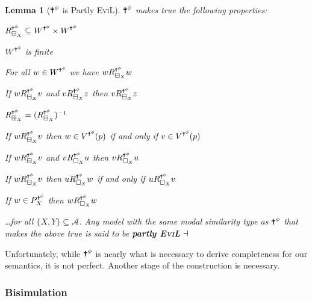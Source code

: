 \documentclass[11pt]{article}
\numberwithin{equation}{subsection}
\newtheorem{lemma}[theorem]{Lemma}
\renewcommand{\Cross}{\textrm{\ding{61}}}
\newcommand{\Nec}{\Box}
\newcommand{\BB}{\boxminus}
\newcommand{\BBI}{\boxplus}
\begin{document}
\begin{lemma}[$\Cross^\phi$ is Partly \textsc{EviL}]\label{partly}
$\Cross^\phi$ makes true the following properties:
\begin{mynum}
\item $R^{\Cross^\phi}_{\BB_X} \subseteq W^{\Cross^\phi} \times W^{\Cross^\phi}$
\item $W^{\Cross^\phi}$ is finite
\item For all $w \in W^{\Cross^\phi}$ we have $w R^{\Cross^\phi}_{\BB_X} w$ 
\item If $w R^{\Cross^\phi}_{\BB_X} v$ and $v R^{\Cross^\phi}_{\BB_X} z$ then $v R^{\Cross^\phi}_{\BB_X} z$
\item $R^{\Cross^\phi}_{\BBI_X} = (R^{\Cross^\phi}_{\BB_X})^{-1}$
\item If $w R^{\Cross^\phi}_{\BB_X} v$ then $w \in V^{\Cross^\phi}(p)$ if and only if $v \in V^{\Cross^\phi}(p)$
\item If $w R^{\Cross^\phi}_{\BB_X} v$ and $v R^{\Cross^\phi}_{\Nec_X} u$ then $v R^{\Cross^\phi}_{\Nec_X} u$
\item If $w R^{\Cross^\phi}_{\BB_X} v$ then $u R^{\Cross^\phi}_{\Nec_X} w$ if and only if $u R^{\Cross^\phi}_{\Nec_X} v$
\item If $w\in P^{\Cross^\phi}_X$ then $w R^{\Cross^\phi}_{\Nec_X} w$
\end{mynum}
\ldots for all $\{X,Y\} \subseteq \mathcal{A}$.  Any model with the same modal similarity type as $\Cross^\phi$ that makes the above true is said to be \textbf{partly \textsc{EviL}}
$\hfill\dashv$
\end{lemma}

Unfortunately, while $\Cross^\phi$ is nearly what is necessary to derive completeness for our semantics, it is not perfect.  Another stage of the construction is necessary.

\subsubsection{Bisimulation}
\end{document}
